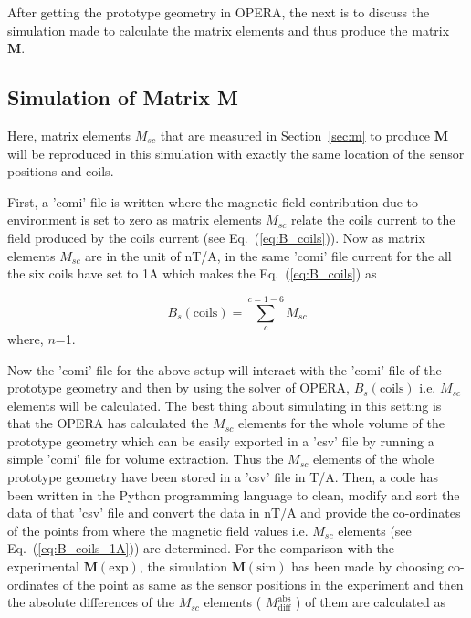 After getting the prototype geometry in OPERA, the next is to discuss the simulation made to calculate the matrix elements and thus produce the matrix $\bm{M}$.

\subsection{Simulation of Matrix M}\label{sec:mSim}

Here, matrix elements $M_{sc}$ that are measured in Section~\ref{sec:m} to produce $\bm{M}$ will be reproduced in this simulation with exactly the same location of the sensor positions and coils. 

 First, a 'comi' file is written where the magnetic field contribution due to environment is set to zero as  matrix elements $M_{sc}$ relate the coils current to the field produced by the coils current (see Eq.~(\ref{eq:B_coils})). Now as matrix elements $M_{sc}$ are in the unit of nT/A, in the same 'comi' file current for the all the six coils have set to 1A which makes the Eq.~(\ref{eq:B_coils}) as

\begin{equation}\label{eq:B_coils_1A}
    B_s(\text{coils})=\sum_c^{c=1-6} M_{sc}
\end{equation}
where, $n$=1.

Now the 'comi' file for the above setup will interact with the 'comi' file of the prototype geometry and then by using the solver of OPERA, $B_s(\text{coils})$ i.e. $M_{sc}$ elements will be calculated.  The best thing about simulating in this setting is that the OPERA has calculated the $M_{sc}$ elements for the whole volume of the prototype geometry which can be easily exported in a 'csv' file by running a simple 'comi' file for volume extraction. Thus the $M_{sc}$ elements of the whole prototype geometry have been stored in a 'csv' file in T/A. Then, a code has been written in the Python programming language to clean, modify and sort the data of that 'csv' file and convert the data in nT/A and  provide the co-ordinates of the points from where the magnetic field values i.e.  $M_{sc}$ elements (see Eq.~(\ref{eq:B_coils_1A})) are determined. For the comparison with the experimental $\bm{M}(\text{exp})$, the simulation $\bm{M}(\text{sim})$ has been made by choosing co-ordinates of the point as same as the sensor positions in the experiment and then the absolute differences of the  $M_{sc}$ elements ( $M_{\text{diff}}^{\text{abs}}$ ) of them are calculated as

